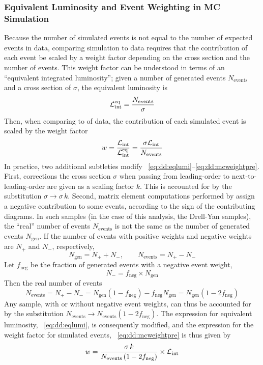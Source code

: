 \subsubsection{Equivalent Luminosity and Event Weighting in MC Simulation}
Because the number of simulated events is not equal to the number of expected events in data, comparing simulation to data requires that the contribution of each event be scaled by a weight factor depending on the cross section and the number of events.
This weight factor can be understood in terms of an ``equivalent integrated luminosity''; given a number of generated events $N_\text{events}$ and a cross section of $\sigma$, the equivalent luminosity is
\begin{equation}
  \mathcal{L}_\mathrm{int}^\text{eq} = \frac{N_\text{events}}{\sigma}
  \label{eq:dd:eqlumi}
\end{equation}
Then, when comparing to \intlumi of data, the contribution of each simulated event is scaled by the weight factor
\begin{equation}
  w = \frac{\mathcal{L}_\mathrm{int}}{\mathcal{L}_\mathrm{int}^\text{eq}} = \frac{\sigma\mathcal{L}_\mathrm{int}}{N_\text{events}}
  \label{eq:dd:mcweightpre}
\end{equation}
In practice, two additional subtleties modify \Eqs~\ref{eq:dd:eqlumi}--\ref{eq:dd:mcweightpre}.
First, corrections the cross section $\sigma$ when passing from leading-order to next-to-leading-order are given as a scaling factor $k$.
This is accounted for by the substitution $\sigma \to \sigma \, k$.
Second, matrix element computations performed by \MGvATNLO assign a negative contribution to some events, according to the sign of the contributing diagrams.
In such samples (in the case of this analysis, the Drell-Yan samples), the ``real'' number of events $N_\text{events}$ is not the same as the number of generated events $N_\text{gen}$.
If the number of events with positive weights and negative weights are $N_+$ and $N_-$, respectively,
$$N_{\text{gen}} = N_+ + N_-,\quad\quad N_\text{events} = N_+ - N_-$$
Let $f_\text{neg}$ be the fraction of generated events with a negative event weight, \ie $$N_- = f_\text{neg} \times N_\text{gen}$$
Then the real number of events
\begin{equation}
  N_\text{events} = N_+ - N_- = N_\text{gen}\left(1 - f_\text{neg}\right) - f_\text{neg}N_\text{gen} = N_\text{gen}\left( 1-2f_\text{neg} \right)
  \label{eq:dd:neventsfrac}
\end{equation}
Any sample, with or without negative event weights, can thus be accounted for by the substitution $N_\text{events} \to N_\text{events}\left( 1-2f_\text{neg} \right)$.
The expression for equivalent luminosity, \Eq~\ref{eq:dd:eqlumi}, is consequently modified, and the expression for the weight factor for simulated events, \Eq~\ref{eq:dd:mcweightpre} is thus given by
\begin{equation}
  w = \frac{\sigma\,k}{N_\text{events}\left( 1-2f_\text{neg} \right)} \times \mathcal{L}_\mathrm{int}
  \label{eq:dd:mcweight}
\end{equation}

